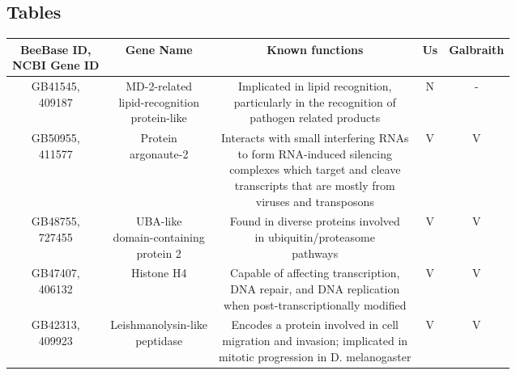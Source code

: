 \documentclass{bmcart}
\begin{document}
\begin{linenumbers}
\begin{backmatter}
\newpage
\section*{Tables}

\begin{table}[h!]
\begin{tabular}{ccccc}
\hline
\makecell{BeeBase ID, \\ NCBI Gene ID} & Gene Name & Known functions & Us & Galbraith \\ 
\hline
\makecell{GB41545, \\ 409187} & \makecell{MD-2-related \\ lipid-recognition \\ protein-like} & \makecell{Implicated in lipid recognition, \\ particularly in the recognition of \\ pathogen related products} & N & - \\
\hline
\makecell{GB50955, \\ 411577} & \makecell{Protein \\ argonaute-2} & \makecell{Interacts with small interfering RNAs \\ to form RNA-induced silencing \\ complexes which target and cleave \\ transcripts that are mostly from \\ viruses and transposons} & V & V \\
\hline
\makecell{GB48755, \\ 727455} & \makecell{UBA-like \\ domain-containing \\ protein 2} & \makecell{Found in diverse proteins involved \\ in ubiquitin/proteasome \\ pathways} & V & V \\
\hline
\makecell{GB47407, \\ 406132} & Histone H4 & \makecell{Capable of affecting transcription, \\ DNA repair, and DNA replication \\ when post-transcriptionally modified} & V & V \\
\hline
\makecell{GB42313, \\ 409923} & \makecell{Leishmanolysin-like \\ peptidase} & \makecell{Encodes a protein involved in cell \\ migration and invasion; implicated in \\ mitotic progression in D. melanogaster} & V & V \\

\end{tabular}
\end{table}
\end{backmatter}
\end{linenumbers}
\end{document}
